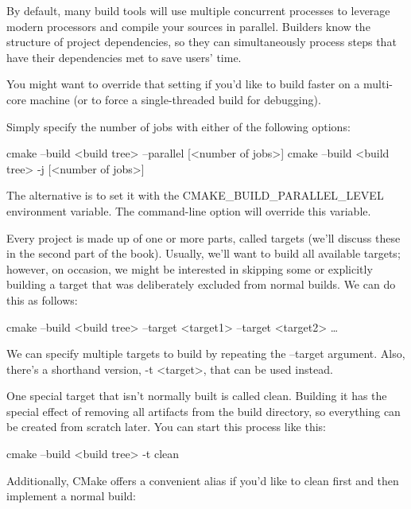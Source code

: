 
By default, many build tools will use multiple concurrent processes to leverage modern processors and compile your sources in parallel. Builders know the structure of project dependencies, so they can simultaneously process steps that have their dependencies met to save users’ time.

You might want to override that setting if you’d like to build faster on a multi-core machine (or to force a single-threaded build for debugging).

Simply specify the number of jobs with either of the following options:

\begin{shell}
cmake --build <build tree> --parallel [<number of jobs>]
cmake --build <build tree> -j [<number of jobs>]
\end{shell}

The alternative is to set it with the CMAKE\_BUILD\_PARALLEL\_LEVEL environment variable. The command-line option will override this variable.


Every project is made up of one or more parts, called targets (we’ll discuss these in the second part of the book). Usually, we’ll want to build all available targets; however, on occasion, we might be interested in skipping some or explicitly building a target that was deliberately excluded from normal builds. We can do this as follows:

\begin{shell}
cmake --build <build tree> --target <target1> --target <target2> …
\end{shell}

We can specify multiple targets to build by repeating the –target argument. Also, there’s a shorthand version, -t <target>, that can be used instead.


One special target that isn’t normally built is called clean. Building it has the special effect of removing all artifacts from the build directory, so everything can be created from scratch later.
You can start this process like this:

\begin{shell}
cmake --build <build tree> -t clean
\end{shell}

Additionally, CMake offers a convenient alias if you’d like to clean first and then implement a normal build:

